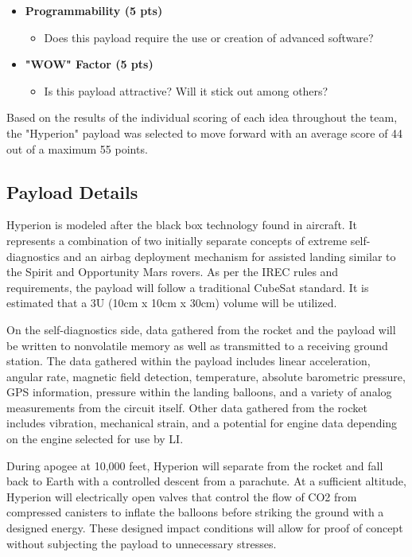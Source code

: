 \documentclass[conference]{IEEEtran} %
\begin{document}
\begin{itemize}
  \item \textbf{Programmability (5 pts)}
  \begin{itemize}
    \item Does this payload require the use or creation of advanced software?
  \end{itemize}

  \item \textbf{"WOW" Factor (5 pts)}
  \begin{itemize}
    \item Is this payload attractive? Will it stick out among others?
  \end{itemize}
\end{itemize}

Based on the results of the individual scoring of each idea throughout the team, the "Hyperion" payload was selected to move forward with
an average score of 44 out of a maximum 55 points.

\subsection{Payload Details}
\label{subsec:Payload Details}
Hyperion is modeled after the black box technology found in aircraft. It represents a combination of two initially separate concepts of extreme self-diagnostics
and an airbag deployment mechanism for assisted landing similar to the Spirit and Opportunity Mars rovers. As per the IREC rules and requirements, the payload will
follow a traditional CubeSat standard. It is estimated that a 3U (10cm x 10cm x 30cm) volume will be utilized.

On the self-diagnostics side, data gathered from the rocket and the payload will be written to nonvolatile
memory as well as transmitted to a receiving ground station. The data gathered within the payload includes linear acceleration, angular rate, magnetic field detection,
temperature, absolute barometric pressure, GPS information, pressure within the landing balloons, and a variety of analog measurements from the circuit itself. Other data
gathered from the rocket includes vibration, mechanical strain, and a potential for engine data depending on the engine selected for use by LI.

During apogee at 10,000 feet, Hyperion will separate from the rocket and fall back to Earth with a controlled descent from a parachute. At a sufficient altitude, Hyperion will
electrically open valves that control the flow of CO2 from compressed canisters to inflate the balloons before striking the ground with a designed energy. These designed impact
conditions will allow for proof of concept without subjecting the payload to unnecessary stresses.
\end{document}
